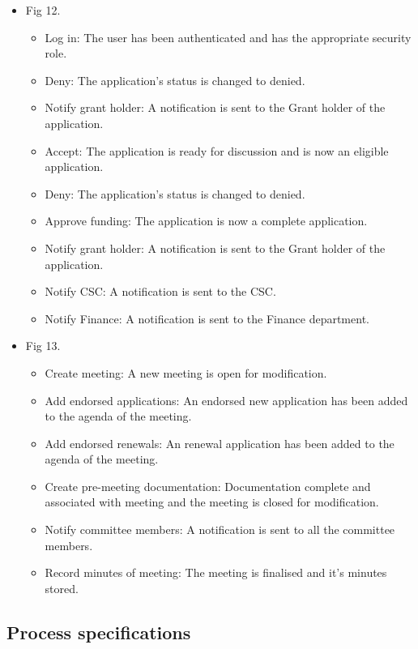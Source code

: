 \documentclass[12pt]{article}
\begin{document}
\begin{itemize}
	\item Fig 12.
		\begin{itemize}
			\item Log in: The user has been authenticated and has the appropriate security role.
			\item Deny: The application's status is changed to denied. 
			\item Notify grant holder: A notification is sent to the Grant holder of the application.
			\item Accept: The application is ready for discussion and is now an eligible application.			
			\item Deny: The application's status is changed to denied.			
			\item Approve funding: The application is now a complete application.
			\item Notify grant holder: A notification is sent to the Grant holder of the application.
			\item Notify CSC: A notification is sent to the CSC.
			\item Notify Finance: A notification is sent to the Finance department.									
		\end{itemize}
	
	\item Fig 13.
		\begin{itemize}
			\item Create meeting: A new meeting is open for modification.
			\item Add endorsed applications: An endorsed new application has been added to the agenda of the meeting.
			\item Add endorsed renewals: An renewal application has been added to the agenda of the meeting.
			\item Create pre-meeting documentation: Documentation complete and associated with meeting and the meeting is closed for modification.
			\item Notify committee members: A notification is sent to all the committee members.
			\item Record minutes of meeting: The meeting is finalised and it's minutes stored.							
		\end{itemize}

\end{itemize}


\vspace{0.2in}

\subsection{Process specifications} %
\vspace{0.2in}
\end{document}
